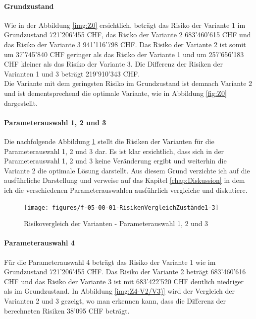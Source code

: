 \paragraph{Grundzustand}

Wie in der Abbildung \ref{img:Z0} ersichtlich, beträgt das Risiko der Variante 1 im Grundzustand 721'206'455 CHF, das Risiko der Variante 2 683'460'615 CHF und das Risiko der Variante 3 941'116'798 CHF. Das Risiko der Variante 2 ist somit um 37'745'840 CHF geringer als das Risiko der Variante 1 und um 257'656'183 CHF kleiner als das Risiko der Variante 3. Die Differenz der Risiken der Varianten 1 und 3 beträgt 219'910'343 CHF. \\
Die Variante mit dem geringsten Risiko im Grundzustand ist demnach Variante 2 und ist dementsprechend die optimale Variante, wie in Abbildung \ref{fig:Z0} dargestellt.

\paragraph{Parameterauswahl 1, 2 und 3}

Die nachfolgende Abbildung \ref{img:RisikovergleichVarianten123} stellt die Risiken der Varianten für die Parameterauswahl 1, 2 und 3 dar. Es ist klar ersichtlich, dass sich in der Parameterauswahl 1, 2 und 3 keine Veränderung ergibt und weiterhin die Variante 2 die optimale Lösung darstellt. Aus diesem Grund verzichte ich auf die ausführliche Darstellung und verweise auf das Kapitel \ref{chap:Diskussion} in dem ich die verschiedenen Parameterauswahlen ausführlich vergleiche und diskutiere.

\begin{figure}[h!]
	\centering
	\texttt{[image: figures/f-05-00-01-RisikenVergleichZustände1-3]}
	\caption[Risikovergleich der Parameterauswahl 1, 2 und 3]{Risikovergleich der Varianten - Parameterauswahl 1, 2 und 3}
	\label{img:RisikovergleichVarianten123}
\end{figure}

\paragraph{Parameterauswahl 4}

Für die Parameterauswahl 4 beträgt das Risiko der Variante 1 wie im Grundzustand 721'206'455 CHF. Das Risiko der Variante 2 beträgt 683'460'616 CHF und das Risiko der Variante 3 ist mit 683'422'520 CHF deutlich niedriger als im Grundzustand. In Abbildung \ref{img:Z4-V2/V3)} wird der Vergleich der Varianten 2 und 3 gezeigt, wo man erkennen kann, dass die Differenz der berechneten Risiken 38'095 CHF beträgt.

